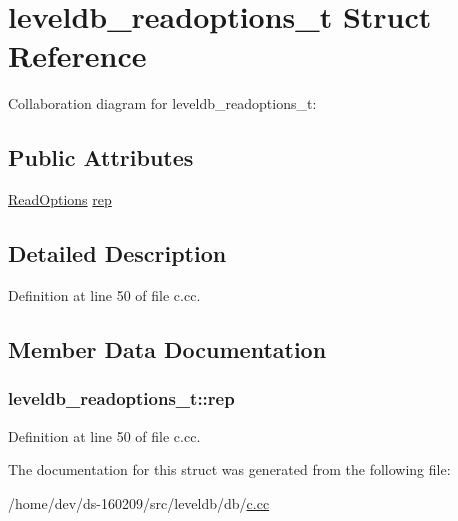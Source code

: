 \hypertarget{structleveldb__readoptions__t}{}\section{leveldb\+\_\+readoptions\+\_\+t Struct Reference}
\label{structleveldb__readoptions__t}


Collaboration diagram for leveldb\+\_\+readoptions\+\_\+t\+:
\subsection*{Public Attributes}
\begin{DoxyCompactItemize}
\item 
\hyperlink{structleveldb_1_1_read_options}{Read\+Options} \hyperlink{structleveldb__readoptions__t_ad4bc0f881cf2c7a859642cd878dd568c}{rep}
\end{DoxyCompactItemize}


\subsection{Detailed Description}


Definition at line 50 of file c.\+cc.



\subsection{Member Data Documentation}
\hypertarget{structleveldb__readoptions__t_ad4bc0f881cf2c7a859642cd878dd568c}{}
\subsubsection[{rep}]{ leveldb\+\_\+readoptions\+\_\+t\+::rep}\label{structleveldb__readoptions__t_ad4bc0f881cf2c7a859642cd878dd568c}


Definition at line 50 of file c.\+cc.



The documentation for this struct was generated from the following file\+:\begin{DoxyCompactItemize}
\item 
/home/dev/ds-\/160209/src/leveldb/db/\hyperlink{c_8cc}{c.\+cc}\end{DoxyCompactItemize}
